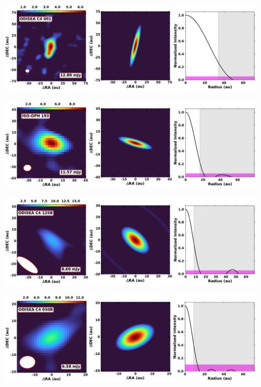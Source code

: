 \vspace{0pt}
\begin{minipage}{.49\textwidth}
	 \centering
	 	 \hrulesep
	 	 \includegraphics[width=1\linewidth]{pdf/0+II/010_odisea_c4_001_cutout.pdf}
\end{minipage}%
\vrulesep
\begin{minipage}{.49\textwidth}
	 \centering
	 	 \hrulesep
	 	 \includegraphics[width=1\linewidth]{pdf/0+II/007_iso-oph_193_cutout.pdf}
\end{minipage}%
\vspace{0pt}
\begin{minipage}{.49\textwidth}
	 \centering
	 	 \hrulesep
	 	 \includegraphics[width=1\linewidth]{pdf/0+II/004_odisea_c4_125b_cutout.pdf}
\end{minipage}%
\vrulesep
\begin{minipage}{.49\textwidth}
	 \centering
	 	 \hrulesep
	 	 \includegraphics[width=1\linewidth]{pdf/0+II/002_odisea_c4_050b_cutout.pdf}
\end{minipage}%
